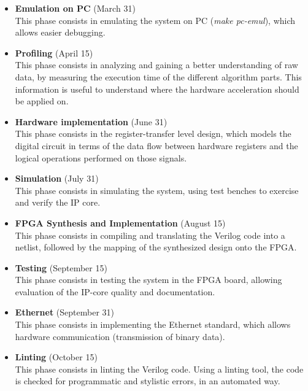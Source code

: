 \begin{itemize}
\item \textbf{Emulation on PC} (March 31)\\
This phase consists in emulating the system on PC (\textit{make pc-emul}), which allows easier debugging.

\item \textbf{Profiling} (April 15)\\
This phase consists in analyzing and gaining a better understanding of raw data, by measuring the execution time of the different algorithm parts. This information is useful to understand where the hardware acceleration should be applied on.

\item \textbf{Hardware implementation} (June 31)\\
This phase consists in the register-transfer level design, which models the digital circuit in terms of the data flow between hardware registers and the logical operations performed on those signals.

\item \textbf{Simulation} (July 31)\\
This phase consists in simulating the system, using test benches to exercise and verify the IP core.

\item \textbf{FPGA Synthesis and Implementation} (August 15)\\
This phase consists in compiling and translating the Verilog code into a netlist, followed by the mapping of the synthesized design onto the FPGA.

\item \textbf{Testing} (September 15)\\
This phase consists in testing the system in the FPGA board, allowing evaluation of the IP-core quality and documentation.

\item \textbf{Ethernet} (September 31)\\
This phase consists in implementing the Ethernet standard, which allows hardware communication (transmission of binary data).

\item \textbf{Linting} (October 15)\\
This phase consists in linting the Verilog code. Using a linting tool, the code is checked for programmatic and stylistic errors, in an automated way.

\end{itemize}



